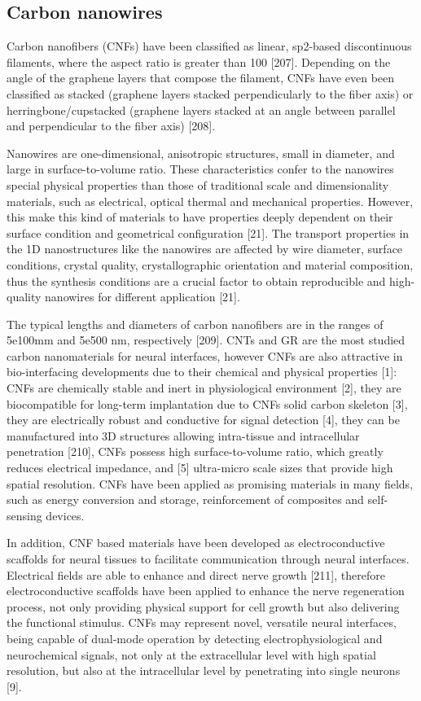 \subsection{Carbon nanowires}

Carbon nanofibers (CNFs) have been classified as linear, sp2-based discontinuous filaments, where the aspect ratio is greater than 100 [207]. Depending on the angle of the graphene layers that compose the filament, CNFs have even been classified as stacked (graphene layers stacked perpendicularly to the fiber axis) or herringbone/cupstacked (graphene layers stacked at an angle between parallel and perpendicular to the fiber axis) [208].

Nanowires are one-dimensional, anisotropic structures, small in diameter, and large in surface-to-volume ratio. These characteristics confer to the nanowires special physical properties than those of traditional scale and dimensionality materials, such as electrical, optical thermal and mechanical properties. However, this make this kind of materials to have properties deeply dependent on their surface condition and geometrical configuration [21]. The transport properties in the 1D nanostructures like the nanowires are affected by wire diameter, surface conditions, crystal quality, crystallographic orientation and material composition, thus the synthesis conditions are a crucial factor to obtain reproducible and high-quality nanowires for different application [21].

The typical lengths and diameters of carbon nanofibers are in the ranges of 5e100mm and 5e500 nm, respectively [209]. CNTs and GR are the most studied carbon nanomaterials for neural interfaces, however CNFs are also attractive in bio-interfacing developments due to their chemical and physical properties [1]: CNFs are chemically stable and inert in physiological environment [2], they are biocompatible for long-term implantation due to CNFs solid carbon skeleton [3], they are electrically robust and conductive for signal detection [4], they can be manufactured into 3D structures allowing intra-tissue and intracellular penetration [210], CNFs possess high surface-to-volume ratio, which greatly reduces electrical impedance, and [5] ultra-micro scale sizes that provide high spatial resolution. CNFs have been applied as promising materials in many fields, such as energy conversion and storage, reinforcement of composites and self-sensing devices.

In addition, CNF based materials have been developed as electroconductive scaffolds for neural tissues to facilitate communication through neural interfaces. Electrical fields are able to enhance and direct nerve growth [211], therefore electroconductive scaffolds have been applied to enhance the nerve regeneration process, not only providing physical support for cell growth but also delivering the functional stimulus. CNFs may represent novel, versatile neural interfaces, being capable of dual-mode operation by detecting electrophysiological and neurochemical signals, not only at the extracellular level with high spatial resolution, but also at the intracellular level by penetrating into single neurons [9].


